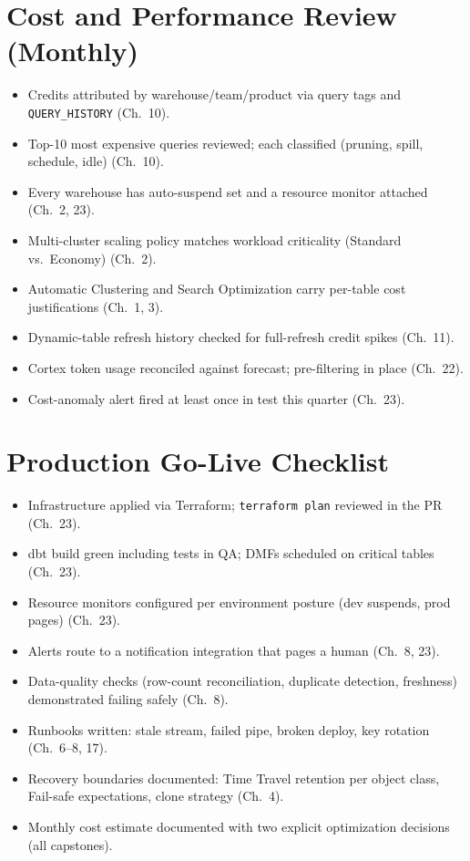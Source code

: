\section{Cost and Performance Review (Monthly)}
\begin{itemize}
    \item[$\square$] Credits attributed by warehouse/team/product via query tags and \texttt{QUERY\_HISTORY} (Ch.~10).
    \item[$\square$] Top-10 most expensive queries reviewed; each classified (pruning, spill, schedule, idle) (Ch.~10).
    \item[$\square$] Every warehouse has auto-suspend set and a resource monitor attached (Ch.~2, 23).
    \item[$\square$] Multi-cluster scaling policy matches workload criticality (Standard vs.\ Economy) (Ch.~2).
    \item[$\square$] Automatic Clustering and Search Optimization carry per-table cost justifications (Ch.~1, 3).
    \item[$\square$] Dynamic-table refresh history checked for full-refresh credit spikes (Ch.~11).
    \item[$\square$] Cortex token usage reconciled against forecast; pre-filtering in place (Ch.~22).
    \item[$\square$] Cost-anomaly alert fired at least once in test this quarter (Ch.~23).
\end{itemize}

\section{Production Go-Live Checklist}
\begin{itemize}
    \item[$\square$] Infrastructure applied via Terraform; \texttt{terraform plan} reviewed in the PR (Ch.~23).
    \item[$\square$] dbt build green including tests in QA; DMFs scheduled on critical tables (Ch.~23).
    \item[$\square$] Resource monitors configured per environment posture (dev suspends, prod pages) (Ch.~23).
    \item[$\square$] Alerts route to a notification integration that pages a human (Ch.~8, 23).
    \item[$\square$] Data-quality checks (row-count reconciliation, duplicate detection, freshness) demonstrated failing safely (Ch.~8).
    \item[$\square$] Runbooks written: stale stream, failed pipe, broken deploy, key rotation (Ch.~6--8, 17).
    \item[$\square$] Recovery boundaries documented: Time Travel retention per object class, Fail-safe expectations, clone strategy (Ch.~4).
    \item[$\square$] Monthly cost estimate documented with two explicit optimization decisions (all capstones).
\end{itemize}

